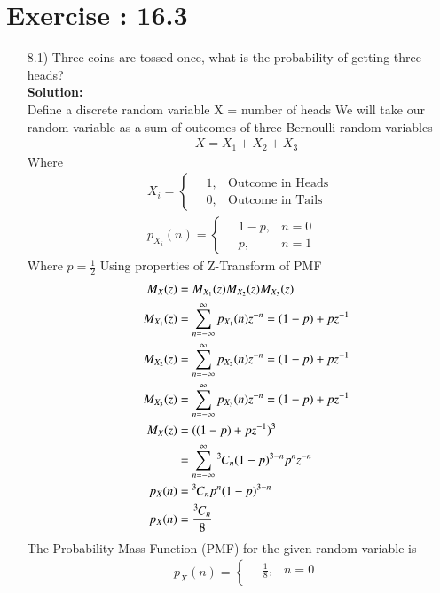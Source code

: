 \documentclass[journal]{IEEEtran}
\begin{document}
\section*{Exercise : 16.3}
\begin{enumerate}
\item [8.1)] Three coins are tossed once, what is the probability of getting three heads?\\
\textbf{Solution: }\\
Define a discrete random variable X = number of heads\newline
We will take our random variable as a sum of outcomes of three Bernoulli random variables
\begin{align}
\quad X = X_1+X_2+X_3
\end{align}
Where
\begin{align}
X_i = 
\begin{cases}
\quad 1, & \text{Outcome in Heads}\\
\quad 0, & \text{Outcome in Tails}
\end{cases}\\
p_{X_i}(n) = 
\begin{cases}
\quad 1-p, & n = 0\\
\quad p, & n = 1
\end{cases}
\end{align}
Where $p=\frac{1}{2}$\newline
Using properties of Z-Transform of PMF
\begin{align}
\quad M_X(z) &= M_{X_1}(z)M_{X_2}(z)M_{X_3}(z)\\
\quad M_{X_1}(z) &= \sum_{n=-\infty}^{\infty}p_{X_1}(n)z^{-n} = (1-p)+pz^{-1}\\
\quad M_{X_2}(z) &= \sum_{n=-\infty}^{\infty}p_{X_2}(n)z^{-n} = (1-p)+pz^{-1}\\
\quad M_{X_3}(z) &= \sum_{n=-\infty}^{\infty}p_{X_3}(n)z^{-n} = (1-p)+pz^{-1}\\
\quad M_X(z) &= ((1-p)+pz^{-1})^3\\
\quad &= \sum_{n=-\infty}^{\infty}{{}^{3}\mkern-1muC_{n}}(1-p)^{3-n}p^nz^{-n}\\
\quad p_{X}(n) &= {{}^{3}\mkern-1muC_{n}}p^{n}(1-p)^{3-n}\\
\quad p_{X}(n) &= \frac{{{}^{3}\mkern-1muC_{n}}}{8}
\end{align}
The Probability Mass Function (PMF) for the given random variable is
\begin{align}
\quad p_X(n) =
\begin{cases}
\quad \frac{1}{8}, & n = 0 \\

\end{cases}
\end{align}
\end{enumerate}
\end{document}

